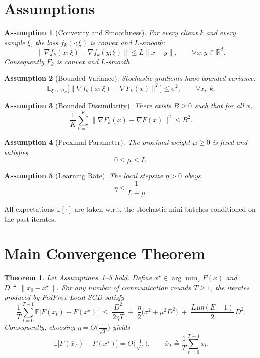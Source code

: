 \documentclass[11pt]{article}
\newtheorem{theorem}{Theorem}
\newtheorem{assumption}{Assumption}
\begin{document}
\section*{Assumptions}
\begin{assumption}[Convexity and Smoothness]
\label{as:smooth}
For every client $k$ and every sample $\xi$, the loss $f_k(\cdot;\xi)$ is
convex and $L$-smooth:
\[
\|\nabla f_k(x;\xi)-\nabla f_k(y;\xi)\|\le L\|x-y\|,\qquad
\forall x,y\in\mathbb{R}^d .
\]
Consequently $F_k$ is convex and $L$-smooth.
\end{assumption}

\begin{assumption}[Bounded Variance]
\label{as:variance}
Stochastic gradients have bounded variance:
\[
\mathbb{E}_{\xi\sim\mathcal{D}_k}\big[\| \nabla f_k(x;\xi)-\nabla F_k(x)\|^2\big]
\le\sigma^2,\qquad\forall x,\;k .
\]
\end{assumption}

\begin{assumption}[Bounded Dissimilarity]
\label{as:dissimilarity}
There exists $B\ge0$ such that for all $x$,
\[
\frac{1}{K}\sum_{k=1}^{K}\|\nabla F_k(x)-\nabla F(x)\|^2\le B^2 .
\]
\end{assumption}

\begin{assumption}[Proximal Parameter]
\label{as:mu}
The proximal weight $\mu\ge0$ is fixed and satisfies
\[
0\le\mu\le L .
\]
\end{assumption}

\begin{assumption}[Learning Rate]
\label{as:eta}
The local stepsize $\eta>0$ obeys
\[
\eta\le \frac{1}{L+\mu}.
\]
\end{assumption}

All expectations $\mathbb{E}[\cdot]$ are taken w.r.t. the stochastic
mini‑batches conditioned on the past iterates.

\section*{Main Convergence Theorem}
\begin{theorem}
\label{thm:conv}
Let Assumptions~\ref{as:smooth}–\ref{as:eta} hold.
Define $x^\star\in\arg\min_x F(x)$ and $D\triangleq\|x_0-x^\star\|$.
For any number of communication rounds $T\ge1$, the iterates
produced by FedProx Local SGD satisfy
\[
\frac{1}{T}\sum_{t=0}^{T-1}\mathbb{E}\big[F(x_t)-F(x^\star)\big]
\;\le\;
\frac{D^2}{2\eta T}
\;+\;
\frac{\eta}{2}\big(\sigma^2+\mu^2 D^2\big)
\;+\;
\frac{L\mu\eta (E-1)}{2}\,D^2 .
\tag{1}
\]
Consequently, choosing $\eta = \Theta\!\big(\tfrac{1}{\sqrt{T}}\big)$ yields
\[
\mathbb{E}\big[F(\bar{x}_T)-F(x^\star)\big]=O\!\big(\tfrac{1}{\sqrt{T}}\big),
\qquad
\bar{x}_T\triangleq\frac{1}{T}\sum_{t=0}^{T-1}x_t .
\]
\end{theorem}
\end{document}
